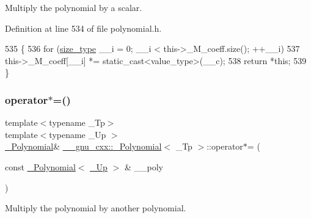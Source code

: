 Multiply the polynomial by a scalar. 

Definition at line 534 of file polynomial.\+h.


\begin{DoxyCode}
535         \{
536           \textcolor{keywordflow}{for} (\hyperlink{class____gnu__cxx_1_1__Polynomial_a8b25fcfd4acaad0c5c08b649c22da28a}{size\_type} \_\_i = 0; \_\_i < this->\_M\_coeff.size(); ++\_\_i)
537             this->\_M\_coeff[\_\_i] *= static\_cast<value\_type>(\_\_c);
538           \textcolor{keywordflow}{return} *\textcolor{keyword}{this};
539         \}
\end{DoxyCode}
\mbox{\label{class____gnu__cxx_1_1__Polynomial_ab7daa447472ac775ee38ef0db323bb19}} 
\subsubsection{\texorpdfstring{operator$\ast$=()}{operator*=()}\hspace{0.1cm}{\footnotesize\ttfamily [3/3]}}
{\footnotesize\ttfamily template$<$typename \+\_\+\+Tp$>$ \\
template$<$typename \+\_\+\+Up $>$ \\
\hyperlink{class____gnu__cxx_1_1__Polynomial}{\+\_\+\+Polynomial}\& \hyperlink{class____gnu__cxx_1_1__Polynomial}{\+\_\+\+\_\+gnu\+\_\+cxx\+::\+\_\+\+Polynomial}$<$ \+\_\+\+Tp $>$\+::operator$\ast$= (\begin{DoxyParamCaption}\item[{const \hyperlink{class____gnu__cxx_1_1__Polynomial}{\+\_\+\+Polynomial}$<$ \hyperlink{class____gnu__cxx_1_1__Polynomial_a242114d4b86648a5dff67a8221f80d40}{\+\_\+\+Up} $>$ \&}]{\+\_\+\+\_\+poly }\end{DoxyParamCaption})}

Multiply the polynomial by another polynomial. \mbox{\label{class____gnu__cxx_1_1__Polynomial_acbaf9cbeb167e41490d976a083f131d8}} 
